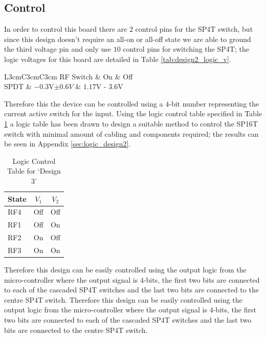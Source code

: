 \documentclass[12pt,openany,a4paper]{book}
\begin{document}
\subsection{Control}
In order to control this board there are $2$ control pins for the SP4T switch, but since this design doesn't require an all-on or all-off state we are able to ground the third voltage pin and only use $10$ control pins for switching the SP4T; the logic voltages for this board are detailed in Table \ref{tab:design2_logic_v}.
\begin{table}[H]
	\centering
	\begin{tabular}{L{3cm}C{3cm}C{3cm}}
	\hline
	RF Switch & On & Off\\
	\hline
	SPDT & $-0.3$V$\pm 0.6V$ & $1.17$V - $3.6$V \\
	\hline	
	\end{tabular}
	\caption{Logic Voltage Control}
	\label{tab:design2_logic_v}
\end{table}
Therefore this the device can be controlled using a $4$-bit number representing the current active switch for the input. Using the logic control table specified in Table \ref{tab:logic-cont-design3} a logic table has been drawn to design a suitable method to control the SP16T switch with minimal amount of cabling and components required; the results can be seen in Appendix \ref{sec:logic_design2}. 
\begin{table}[H]
	\centering
	\begin{tabular}{l c c }
		\hline
		State & $V_1$ & $V_2$\\
		\hline
		RF4 & Off & Off \\
		RF1 & Off & On \\
		RF2 & On & Off\\
		RF3 & On & On	\\	
		\hline
	\end{tabular}
    \caption{Logic Control Table for `Design 3'} \label{tab:logic-cont-design3}
\end{table}
Therefore this design can be easily controlled using the output logic from the micro-controller where the output signal is $4$-bits, the first two bits are connected to each of the cascaded SP4T switches and the last two bits are connected to the centre SP4T switch. Therefore this design can be easily controlled using the output logic from the micro-controller where the output signal is $4$-bits, the first two bits are connected to each of the cascaded SP4T switches and the last two bits are connected to the centre SP4T switch.
\end{document}
